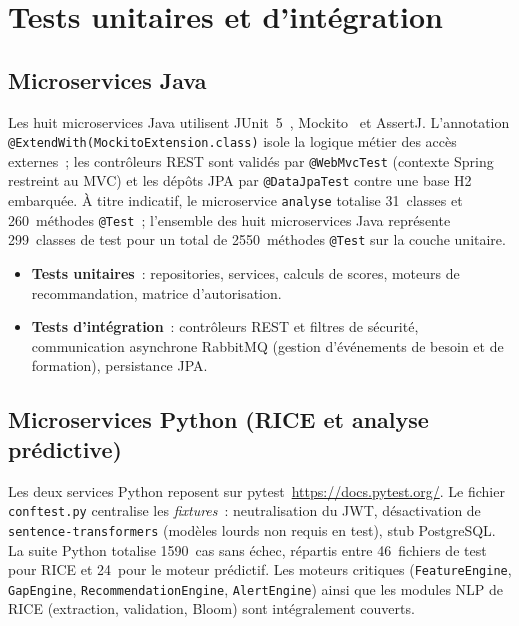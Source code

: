 \documentclass[12pt,a4paper]{report}
\begin{document}
\section{Tests unitaires et d'intégration}

\subsection{Microservices Java}

Les huit microservices Java utilisent JUnit~5~\cite{junit5}, Mockito~\cite{mockito}
et AssertJ. L'annotation \texttt{@ExtendWith(MockitoExtension.class)} isole la
logique métier des accès externes~; les contrôleurs REST sont validés par
\texttt{@WebMvcTest} (contexte Spring restreint au MVC) et les dépôts JPA par
\texttt{@DataJpaTest} contre une base H2 embarquée. À titre indicatif, le
microservice \texttt{analyse} totalise 31~classes et 260~méthodes
\texttt{@Test}~; l'ensemble des huit microservices Java représente 299~classes
de test pour un total de 2550~méthodes \texttt{@Test} sur la couche unitaire.

\begin{itemize}[leftmargin=1.2cm]
  \item \textbf{Tests unitaires}~: repositories, services, calculs de scores,
        moteurs de recommandation, matrice d'autorisation.
  \item \textbf{Tests d'intégration}~: contrôleurs REST et filtres de sécurité,
        communication asynchrone RabbitMQ (gestion d'événements de besoin et
        de formation), persistance JPA.
\end{itemize}

\subsection{Microservices Python (RICE et analyse prédictive)}

Les deux services Python reposent sur pytest~\url{https://docs.pytest.org/}. Le fichier
\texttt{conftest.py} centralise les \emph{fixtures}~: neutralisation du JWT,
désactivation de \texttt{sentence-transformers} (modèles lourds non requis en
test), stub PostgreSQL. La suite Python totalise 1590~cas sans échec, répartis
entre 46~fichiers de test pour RICE et 24~pour le moteur prédictif. Les moteurs
critiques (\texttt{FeatureEngine}, \texttt{GapEngine},
\texttt{RecommendationEngine}, \texttt{AlertEngine}) ainsi que les modules NLP
de RICE (extraction, validation, Bloom) sont intégralement couverts.
\end{document}

